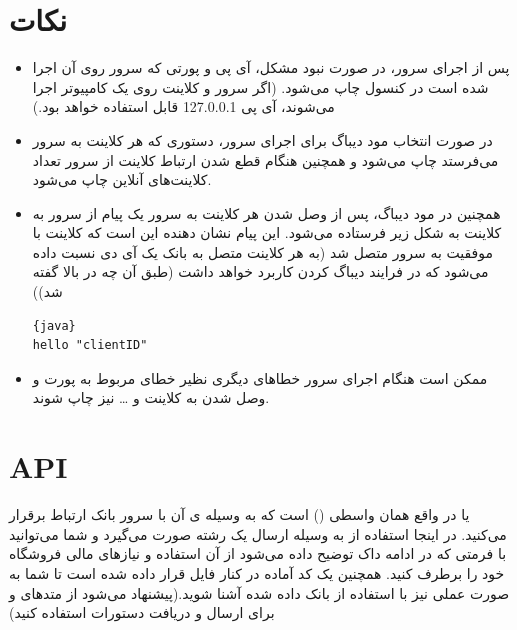 \documentclass[]{article}
\begin{document}
\newpage

\section*{{\titr نکات}}

\begin{itemize}
\item
پس از اجرای سرور، در صورت نبود مشکل، آی پی و پورتی که سرور روی آن اجرا شده است در کنسول چاپ می‌شود. (اگر سرور و کلاینت روی یک کامپیوتر اجرا می‌شوند، آی پی 127.0.0.1 قابل استفاده خواهد بود.)

\item
در صورت انتخاب مود دیباگ برای اجرای سرور، دستوری که هر کلاینت به سرور می‌فرستد چاپ می‌شود و همچنین هنگام قطع شدن ارتباط کلاینت از سرور تعداد کلاینت‌های آنلاین چاپ می‌شود.

\item
همچنین در مود دیباگ، پس از وصل شدن هر کلاینت به سرور یک پیام از سرور به کلاینت به شکل زیر فرستاده می‌شود. این پیام نشان دهنده این است که کلاینت با موفقیت به سرور متصل شد (به هر کلاینت متصل به بانک یک آی دی نسبت داده می‌شود که در فرایند دیباگ کردن کاربرد خواهد داشت (طبق آن چه در بالا گفته شد)‌)


\begin{latin}

\begin{lstlisting}{java}
hello "clientID"
\end{lstlisting}

\end{latin}



\item
ممکن است هنگام اجرای سرور خطاهای دیگری نظیر خطای مربوط به پورت و وصل شدن به کلاینت و … نیز چاپ شوند.

\end{itemize}

\section*{{\titr API}}

 یا  در واقع همان واسطی () است که به وسیله ی آن با سرور بانک ارتباط برقرار می‌کنید. در اینجا استفاده از  به وسیله ارسال یک رشته صورت می‌گیرد و شما می‌توانید با فرمتی که در ادامه داک توضیح داده می‌شود از آن استفاده و نیاز‌های مالی فروشگاه خود را برطرف کنید. همچنین یک کد آماده در کنار فایل  قرار داده شده است تا شما به صورت عملی نیز با استفاده از  بانک داده شده آشنا شوید.(‌پیشنهاد می‌شود از متدهای \href{writeUTF}{\textcolor{blue}{\underline{}}}
 و
  \href{readUTF}{\textcolor{blue}{\underline{}}}
   برای ارسال و دریافت دستورات استفاده کنید)
\end{document}
